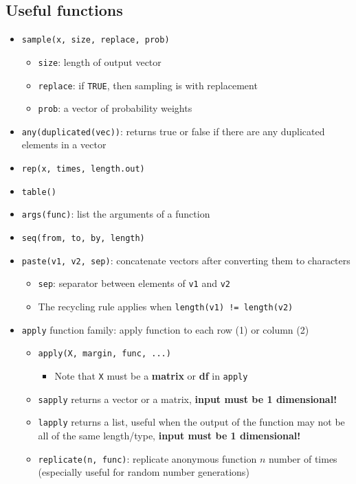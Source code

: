 \documentclass{article}
\begin{document}
\begin{multicols}{2}
\subsection*{Useful functions}
\begin{itemize}
	\item \texttt{sample(x, size, replace, prob)}
	\begin{itemize}
		\item \texttt{size}: length of output vector
		\item \texttt{replace}: if \texttt{TRUE}, then sampling is with replacement
		\item \texttt{prob}: a vector of probability weights
	\end{itemize}
	\item \texttt{any(duplicated(vec))}: returns true or false if there are any duplicated elements in a vector
	\item \texttt{rep(x, times, length.out)}
	\item \texttt{table()}
	\item \texttt{args(func)}: list the arguments of a function
	\item \texttt{seq(from, to, by, length)}
	\item \texttt{paste(v1, v2, sep)}: concatenate vectors after converting them to characters
	\begin{itemize}
		\item \texttt{sep}: separator between elements of \texttt{v1} and \texttt{v2}
		\item The recycling rule applies when \texttt{length(v1) != length(v2)}
	\end{itemize}
	\item \texttt{apply} function family: apply function to each row (1) or column (2)
	\begin{itemize}
		\item \texttt{apply(X, margin, func, ...)}
		\begin{itemize}
			\item Note that \texttt{X} must be a \textbf{matrix} or \textbf{df} in \texttt{apply}
		\end{itemize}
		\item \texttt{sapply} returns a vector or a matrix, \textbf{input must be 1 dimensional!}
		\item \texttt{lapply} returns a list, useful when the output of the function may not be all of the same length/type, \textbf{input must be 1 dimensional!}
		\item \texttt{replicate(n, func)}: replicate anonymous function $n$ number of times (especially useful for random number generations)
	\end{itemize}
\end{itemize}

\end{multicols}
\end{document}
